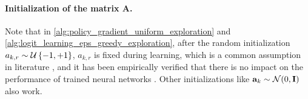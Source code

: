 \paragraph{Initialization of the matrix $\mathbf{A}$.} Note that in \cref{alg:policy_gradient_uniform_exploration} and \cref{alg:logit_learning_eps_greedy_exploration}, after the random initialization $a_{k,r} \sim {\mathcal{U}}\left\{-1, +1\right\}$, $a_{k,r}$ is fixed during learning, which is a common assumption in literature \citep{li2018learning,du2018gradientA,du2018gradientB,allen2018convergenceA,allen2018convergenceB}, and it has been empirically verified that there is no impact on the performance of trained neural networks \citep{hoffer2018fix}. Other initializations like ${\mathbf{a}}_k \sim {\mathcal{N}}(0, {\mathbf{I}})$ also work.